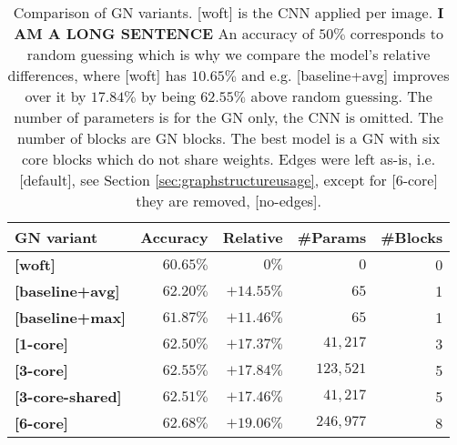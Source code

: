 \begin{table}
    \centering
    \begin{tabular}{lrrrr}
        \textbf{GN variant} & \textbf{Accuracy} & \textbf{Relative} & \textbf{\#Params} & \textbf{\#Blocks}\\\hline
        \textbf{[woft]}         & $60.65\%$ & $0\%$ & $0$ & 0 \\
        \textbf{[baseline+avg]} & $62.20\%$ & $+14.55\%$ & $65$ & 1\\
        \textbf{[baseline+max]} & $61.87\%$ & $+11.46\%$ & $65$ & 1\\
        \textbf{[1-core]}       & $62.50\%$ & $+17.37\%$ & $41,217$ & 3\\
        \textbf{[3-core]}       & $62.55\%$ & $+17.84\%$ & $123,521$ & 5\\
        \textbf{[3-core-shared]}& $62.51\%$ & $+17.46\%$ & $41,217$ & 5\\
        \textbf{[6-core]}       & $\bm{62.68\%}$ & $\bm{+19.06\%}$ & $246,977$ & 8\\
    \end{tabular}
    \caption[Comparison of GN variants]{Comparison of GN variants. [woft] is the CNN applied per image. \textbf{I AM A LONG SENTENCE} An accuracy of $50\%$ corresponds to random guessing which is why we compare the model's relative differences, where [woft] has $10.65\%$ and e.g. [baseline+avg] improves over it by $17.84\%$ by being $62.55\%$ above random guessing. The number of parameters is for the GN only, the CNN is omitted. The number of blocks are GN blocks. The best model is a GN with six core blocks which do not share weights. Edges were left as-is, i.e. [default], see Section \ref{sec:graphstructureusage}, except for [6-core] they are removed, [no-edges].}
    \label{tab:gnvariantscomparison}
\end{table}


